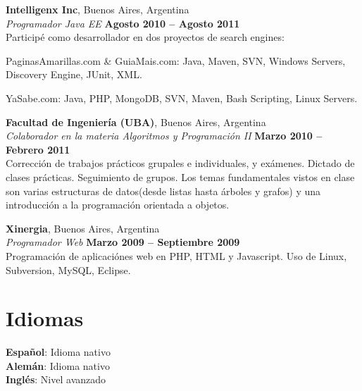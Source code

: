 \documentclass[margin,line]{resume}
\begin{document}
\begin{resume}
    \textbf{Intelligenx Inc}, Buenos Aires, Argentina \vspace{2mm}\\\vspace{1mm}%
    \textsl{Programador Java EE} \hfill \textbf{Agosto 2010 -- Agosto 2011}\\
	Participé como desarrollador en dos proyectos de search engines:
    \begin{list2}
        \item PaginasAmarillas.com \& GuiaMais.com: Java, Maven, SVN, Windows Servers, Discovery Engine, JUnit, XML.
        \item YaSabe.com: Java, PHP, MongoDB, SVN, Maven, Bash Scripting, Linux Servers. 
    \end{list2}\vspace{-1.5mm}	

    \textbf{Facultad de Ingeniería (UBA)}, Buenos Aires, Argentina \vspace{2mm}\\\vspace{1mm}%
    \textsl{Colaborador en la materia Algoritmos y Programación II} \hfill \textbf{Marzo 2010 -- Febrero 2011}\vspace{1.5mm}\\\vspace{0mm}%
	Corrección de trabajos prácticos grupales e individuales, y exámenes. Dictado de clases prácticas. Seguimiento de grupos. Los temas fundamentales vistos en clase son varias estructuras de datos(desde listas hasta árboles y grafos) y una introducción a la programación orientada a objetos.

    \textbf{Xinergia}, Buenos Aires, Argentina \vspace{2mm}\\\vspace{1mm}%
    \textsl{Programador Web} \hfill \textbf{Marzo 2009 -- Septiembre 2009}\\
	Programación de aplicaciónes web en PHP, HTML y Javascript. Uso de Linux, Subversion, MySQL, Eclipse.
    \section{\mysidestyle Idiomas} 

	\textbf{Español}: Idioma nativo	 \\
	\textbf{Alemán}: Idioma nativo   \\
	\textbf{Inglés}: Nivel avanzado \\



\end{resume}
\end{document}
